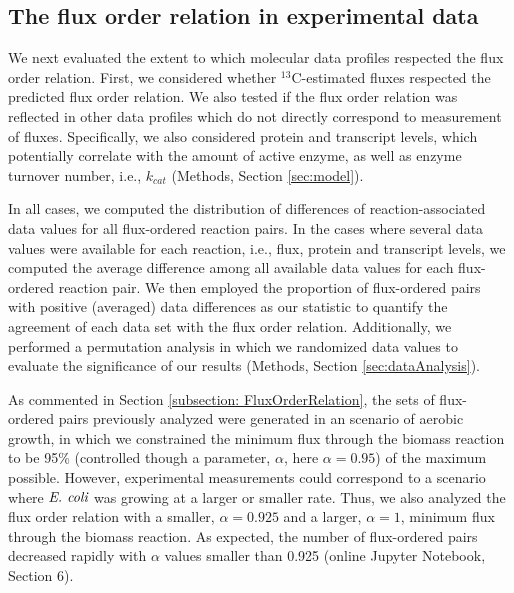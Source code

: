 \documentclass[12pt]{article}
\begin{document}
\subsection{The flux order relation in experimental data}
We next evaluated the extent to which molecular data profiles respected the flux order relation. First, we considered whether ${}^{13}\mathrm{C}$-estimated fluxes respected the predicted flux order relation. We also tested if the flux order relation was reflected in other data profiles which do not directly correspond to measurement of fluxes. Specifically, we also considered protein and transcript levels, which potentially correlate with the amount of active enzyme, as well as enzyme turnover number, i.e., $k_{cat}$ (Methods, Section \ref{sec:model}).

In all cases, we computed the distribution of differences of reaction-associated data values for all flux-ordered reaction pairs. In the cases where several data values were available for each reaction, i.e., flux, protein and transcript levels, we computed the average difference among all available data values for each flux-ordered reaction pair. We then employed the proportion of flux-ordered pairs with positive (averaged) data differences as our statistic to quantify the agreement of each data set with the flux order relation. Additionally, we performed a permutation analysis in which we randomized data values to evaluate the significance of our results (Methods, Section \ref{sec:dataAnalysis}).

{\color{blue} As commented in Section \ref{subsection: FluxOrderRelation}, the sets of flux-ordered pairs previously analyzed were generated in an scenario of aerobic growth, in which we constrained the minimum flux through the biomass reaction to be 95\% (controlled though a parameter, $\alpha$, here $\alpha=0.95$) of the maximum possible. However, experimental measurements could correspond to a scenario where $\emph{E. coli}$ was growing at a larger or smaller rate. Thus, we also analyzed the flux order relation with a smaller, $\alpha=0.925$ and a larger, $\alpha=1$, minimum flux through the biomass reaction. As expected, the number of flux-ordered pairs decreased rapidly with $\alpha$ values smaller than 0.925 (online Jupyter Notebook, Section 6).}
\end{document}
